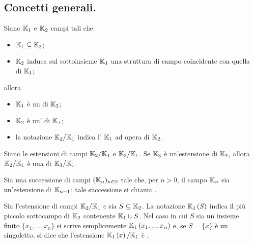 \subsection{Concetti generali.}\label{EstensioniConcettiGenerali}
\begin{Definition}\label{DefEstensione}
	Siano $\mathbb{K}_1$ e $\mathbb{K}_2$ campi tali che
	\begin{itemize}
		\item $\mathbb{K}_1 \subseteq \mathbb{K}_2$;
		\item $\mathbb{K}_2$ induca sul sottoinsieme $\mathbb{K}_1$ una struttura di campo coincidente con quella di $\mathbb{K}_1$;
	\end{itemize}
	allora
	\begin{itemize}
		\item $\mathbb{K}_1$ \`e un  di $\mathbb{K}_2$;
		\item $\mathbb{K}_2$ \`e un' di $\mathbb{K}_1$;
		\item la notazione $\mathbb{K}_2/\mathbb{K}_1$ indica l' $\mathbb{K}_1$ ad opera di $\mathbb{K}_2$.
	\end{itemize}
\end{Definition}
\begin{Definition}\label{DefSottoestensione}
	Siano le estensioni di campi $\mathbb{K}_2/\mathbb{K}_1$ e $\mathbb{K}_3/\mathbb{K}_1$. Se $\mathbb{K}_3$ \`e un'estensione di $\mathbb{K}_2$, allora $\mathbb{K}_2/\mathbb{K}_1$ \`e una  di $\mathbb{K}_3/\mathbb{K}_1$.
\end{Definition}
\begin{Definition}
	Sia una successione di campi $(\mathbb{K}_n)_{n \in \mathbb{N}}$ tale che, per $n > 0$, il campo $\mathbb{K}_n$ sia un'estensione di $\mathbb{K}_{n - 1}$: tale successione si chiama .
\end{Definition}
\begin{Definition}
	Sia l'estensione di campi $\mathbb{K}_2/\mathbb{K}_1$ e sia $S \subseteq \mathbb{K}_2$. La notazione $\mathbb{K}_1 \left ( S \right )$ indica il pi\`u piccolo sottocampo di $\mathbb{K}_2$ contenente $\mathbb{K}_1 \cup S$. Nel caso in cui $S$ sia un insieme finito $\lbrace x_1, ..., x_n \rbrace$ si scrive semplicemente $\mathbb{K}_1 \left ( x_1, ..., x_n \right )$ e, se $S = \lbrace x \rbrace$ \`e un singoletto, si dice che l'estensione $\mathbb{K}_1 \left ( x \right )/\mathbb{K}_1$ \`e .
\end{Definition}
